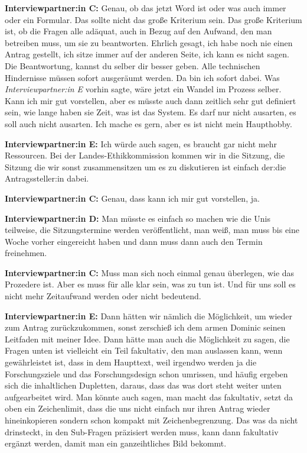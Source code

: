 \documentclass[a4paper,12pt,twoside]{scrreprt}
\begin{document}
\textbf{Interviewpartner:in C:} Genau, ob das jetzt Word ist oder was auch immer oder ein Formular. Das sollte nicht das große Kriterium sein. Das große Kriterium ist, ob die Fragen alle adäquat, auch in Bezug auf den Aufwand, den man betreiben muss, um sie zu beantworten. Ehrlich gesagt, ich habe noch nie einen Antrag gestellt, ich sitze immer auf der anderen Seite, ich kann es nicht sagen. Die Beantwortung, kannst du selber dir besser geben. Alle technischen Hindernisse müssen sofort ausgeräumt werden. Da bin ich sofort dabei. Was \textit{Interviewpartner:in E} vorhin sagte, wäre jetzt ein Wandel im Prozess selber. Kann ich mir gut vorstellen, aber es müsste auch dann zeitlich sehr gut definiert sein, wie lange haben sie Zeit, was ist das System. Es darf nur nicht ausarten, es soll auch nicht ausarten. Ich mache es gern, aber es ist nicht mein Haupthobby.

\textbf{Interviewpartner:in E:} Ich würde auch sagen, es braucht gar nicht mehr Ressourcen. Bei der Landes-Ethikkommission kommen wir in die Sitzung, die Sitzung die wir sonst zusammensitzen um es zu diskutieren ist einfach der:die Antragssteller:in dabei.

\textbf{Interviewpartner:in C:} Genau, dass kann ich mir gut vorstellen, ja.

\textbf{Interviewpartner:in D:} Man müsste es einfach so machen wie die Unis teilweise, die Sitzungstermine werden veröffentlicht, man weiß, man muss bis eine Woche vorher eingereicht haben und dann muss dann auch den Termin freinehmen.

\textbf{Interviewpartner:in C:} Muss man sich noch einmal genau überlegen, wie das Prozedere ist. Aber es muss für alle klar sein, was zu tun ist. Und für uns soll es nicht mehr Zeitaufwand werden oder nicht bedeutend.

\textbf{Interviewpartner:in E:} Dann hätten wir nämlich die Möglichkeit, um wieder zum Antrag zurückzukommen, sonst zerschieß ich dem armen Dominic seinen Leitfaden mit meiner Idee. Dann hätte man auch die Möglichkeit zu sagen, die Fragen unten ist vielleicht ein Teil fakultativ, den man auslassen kann, wenn gewährleistet ist, dass in dem Haupttext, weil irgendwo werden ja die Forschungsziele und das Forschungsdesign schon umrissen, und häufig ergeben sich die inhaltlichen Dupletten, daraus, dass das was dort steht weiter unten aufgearbeitet wird. Man könnte auch sagen, man macht das fakultativ, setzt da oben ein Zeichenlimit, dass die uns nicht einfach nur ihren Antrag wieder hineinkopieren sondern schon kompakt mit Zeichenbegrenzung. Das was da nicht drinsteckt, in den Sub-Fragen präzisiert werden muss, kann dann fakultativ ergänzt werden, damit man ein ganzeihtliches Bild bekommt.
\end{document}
